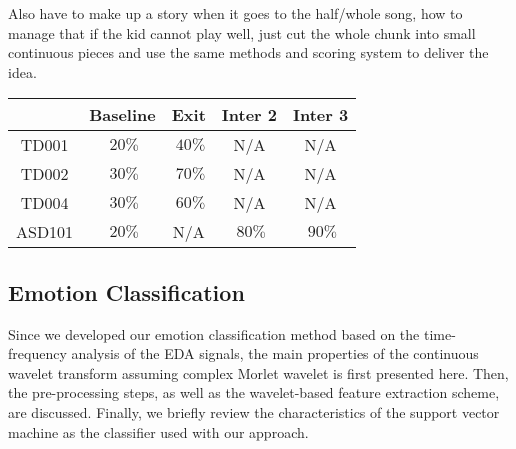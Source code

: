Also have to make up a story when it goes to the half/whole song, how to manage that
if the kid cannot play well, just cut the whole chunk into small continuous pieces
and use the same methods and scoring system to deliver the idea. \\


\begin{tabular}{ | c | c | c | c | c |  }
	\hline
	& Baseline & Exit & Inter 2 & Inter 3 \\ \hline
	TD001 & $~20\%$ & $~40\%$ & N/A & N/A \\ \hline
	TD002 & $~30\%$ & $~70\%$ & N/A & N/A \\ \hline
	TD004 & $~30\%$ & $~60\%$ & N/A & N/A \\ \hline
	ASD101 & $~20\%$ & N/A & $~80\%$ & $~90\%$ \\ \hline
\end{tabular}\newline

\subsection{Emotion Classification}
Since we developed our emotion classification method based on the time-frequency analysis of the
EDA signals, the main properties of the continuous wavelet transform assuming complex Morlet
wavelet is first presented here. Then, the pre-processing steps, as well as the wavelet-based
feature extraction scheme, are discussed. Finally, we briefly review the characteristics of the
support vector machine as the classifier used with our approach.\\

